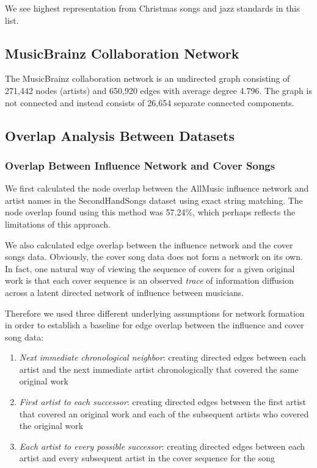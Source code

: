We see highest representation from Christmas songs and jazz standards in this list. 


\subsection{MusicBrainz Collaboration Network}
The MusicBrainz collaboration network is an undirected graph consisting of 271,442 nodes (artists) and 650,920 edges with average degree 4.796. The graph is not connected and instead consists of 26,654 separate connected components.

\subsection{Overlap Analysis Between Datasets}
\subsubsection{Overlap Between Influence Network and Cover Songs}
We first calculated the node overlap between the AllMusic influence network and artist names in the SecondHandSongs dataset using exact string matching. The node overlap found using this method was 57.24\%, which perhaps reflects the limitations of this approach.

We also calculated edge overlap between the influence network and the cover songs data. Obviously, the cover song data does not form a network on its own. In fact, one natural way of viewing the sequence of covers for a given original work is that each cover sequence is an observed \textit{trace} of information diffusion across a latent directed network of influence between musicians. 

Therefore we used three different underlying assumptions for network formation in order to establish a baseline for edge overlap between the influence and cover song data:
\begin{enumerate}
    \item \textit{Next immediate chronological neighbor}: creating directed edges between each artist and the next immediate artist chronologically that covered the same original work
    \item \textit{First artist to each successor}: creating directed edges between the first artist that covered an original work and each of the subsequent artists who covered the original work
    \item \textit{Each artist to every possible successor}: creating directed edges between each artist and every subsequent artist in the cover sequence for the song
\end{enumerate}

